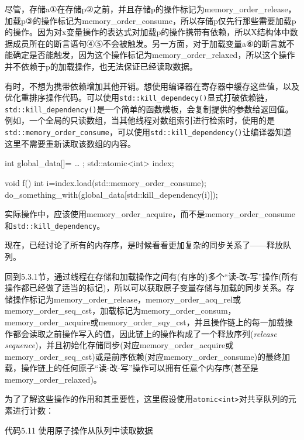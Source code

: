 尽管，存储a①在存储p②之前，并且存储p的操作标记为memory\_order\_release，加载p③的操作标记为memory\_order\_consume，所以存储p仅先行那些需要加载p的操作。因为对x变量操作的表达式对加载p的操作携带有依赖，所以X结构体中数据成员所在的断言语句④⑤不会被触发。另一方面，对于加载变量a⑥的断言就不能确定是否能触发，因为这个操作标记为memory\_order\_relaxed，所以这个操作并不依赖于p的加载操作，也无法保证已经读取数据。

有时，不想为携带依赖增加其他开销。想使用编译器在寄存器中缓存这些值，以及优化重排序操作代码。可以使用\texttt{std::kill\_dependecy()}显式打破依赖链，\texttt{std::kill\_dependency()}是一个简单的函数模板，会复制提供的参数给返回值。例如，一个全局的只读数组，当其他线程对数组索引进行检索时，使用的是\texttt{std::memory\_order\_consume}，可以使用\texttt{std::kill\_dependency()}让编译器知道这里不需要重新读取该数组的内容。

\begin{cpp}
int global_data[]={ … };
std::atomic<int> index;

void f()
{
  int i=index.load(std::memory_order_consume);
  do_something_with(global_data[std::kill_dependency(i)]);
}
\end{cpp}

实际操作中，应该使用memory\_order\_acquire，而不是memory\_order\_consume和\texttt{std::kill\_dependency}。

现在，已经讨论了所有的内存序，是时候看看更加复杂的同步关系了——释放队列。


回到5.3.1节，通过线程在存储和加载操作之间有(有序的)多个“读-改-写”操作(所有操作都已经做了适当的标记)，所以可以获取原子变量存储与加载的同步关系。存储操作标记为memory\_order\_release，memory\_order\_acq\_rel或memory\_order\_seq\_cst，加载标记为memory\_order\_consum，memory\_order\_acquire或memory\_order\_sqy\_cst，并且操作链上的每一加载操作都会读取之前操作写入的值，因此链上的操作构成了一个释放序列(\textit{release sequence})，并且初始化存储同步(对应memory\_order\_acquire或memory\_order\_seq\_cst)或是前序依赖(对应memory\_order\_consume)的最终加载，操作链上的任何原子“读-改-写”操作可以拥有任意个内存序(甚至是memory\_order\_relaxed)。

为了了解这些操作的作用和其重要性，这里假设使用\texttt{atomic<int>}对共享队列的元素进行计数：

代码5.11 使用原子操作从队列中读取数据

